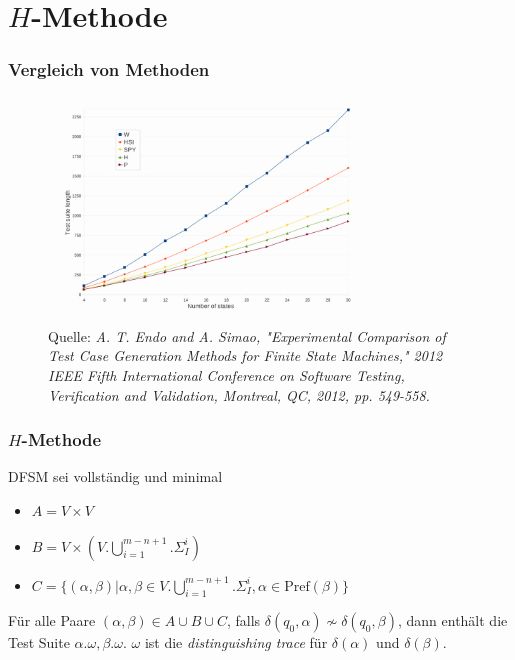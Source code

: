 \section{$H$-Methode}
\begin{frame}
  \frametitle{Vergleich von Methoden}
  \begin{figure}
	  \caption{Quelle: \emph{A. T. Endo and A. Simao, "Experimental Comparison of Test Case Generation Methods for Finite State Machines," 2012 IEEE Fifth International Conference on Software Testing, Verification and Validation, Montreal, QC, 2012, pp. 549-558.} }
	  \centering
	  \includegraphics[width=0.85\textwidth]{images/methodComparison}
	\end{figure}

\end{frame}

\begin{frame}
  \frametitle{$H$-Methode}
  DFSM sei vollständig und minimal
  \begin{itemize}
    \item $A=V\times V$
  	\item $B=V\times (V.\bigcup\limits_{i=1}^{m-n+1}.\Sigma_I^i)$
  	\item $C=\{(\alpha,\beta)|\alpha,\beta\in V.\bigcup\limits_{i=1}^{m-n+1}.\Sigma_I^i, \alpha \in \text{Pref}(\beta)\}$
  \end{itemize}
  Für alle Paare $(\alpha, \beta) \in A\cup B \cup C$, falls $\delta(q_0,\alpha) \not \sim \delta(q_0,\beta)$, dann enthält die Test Suite $\alpha.\omega,\beta.\omega$. $\omega$ ist die \emph{distinguishing trace} für $\delta(\alpha)$ und $\delta(\beta)$.
\end{frame}

